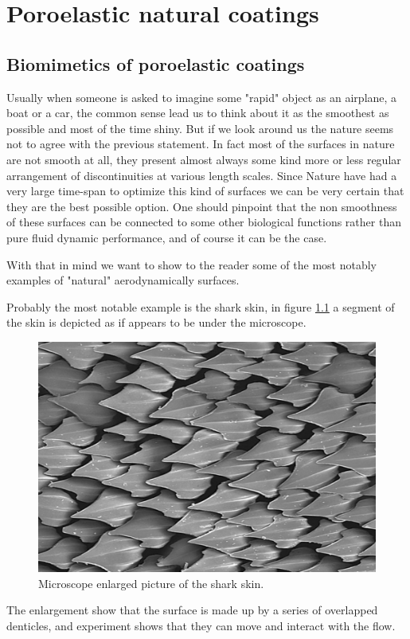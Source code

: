 \chapter{Poroelastic natural coatings}

\section{Biomimetics of poroelastic coatings}

Usually when someone is asked to imagine some "rapid" object as an airplane, a boat or a car, the common sense lead us to think about it as the smoothest as possible and most of the time shiny.
But if we look around us the nature seems not to agree with the previous statement.
In fact most of the surfaces in nature are not smooth at all, they present almost always some kind more or less regular arrangement of discontinuities at various length scales.
Since Nature have had a very large time-span to optimize this kind of surfaces we can be very certain that they are the best possible option.
One should pinpoint that the non smoothness of these surfaces can be connected to some other biological functions rather than pure fluid dynamic performance, and of course it can be the case.


With that in mind we want to show to the reader some of the most notably examples of "natural" aerodynamically surfaces.

Probably the most notable example is the shark skin, in figure \ref{fig:shark} a segment of the skin is depicted as if appears to be under the microscope.

\begin{figure}[h]
	\centering
	\includegraphics[width=0.6\linewidth]{chapter_1/shark}
	\caption{Microscope enlarged picture of the shark skin.}
	\label{fig:shark}
\end{figure}

The enlargement show that the surface is made up by a series of overlapped denticles, and experiment shows that they can move and interact with the flow.

